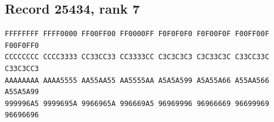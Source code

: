 \documentclass[11pt]{amsart}
\theoremstyle{definition}
\theoremstyle{remark}
\numberwithin{equation}{section}
\numberwithin{table}{section}
\begin{document}
\subsection*{Record 25434, rank 7}
\begin{Verbatim}[fontsize=\scriptsize,xleftmargin=1em]
FFFFFFFF FFFF0000 FF00FF00 FF0000FF F0F0F0F0 F0F00F0F F00FF00F F00F0FF0
CCCCCCCC CCCC3333 CC33CC33 CC3333CC C3C3C3C3 C3C33C3C C33CC33C C33C3CC3
AAAAAAAA AAAA5555 AA55AA55 AA5555AA A5A5A599 A5A55A66 A55AA566 A55A5A99
999996A5 9999695A 9966965A 996669A5 96969996 96966669 96699969 96696696
\end{Verbatim}
\par
{}\par
\end{document}
